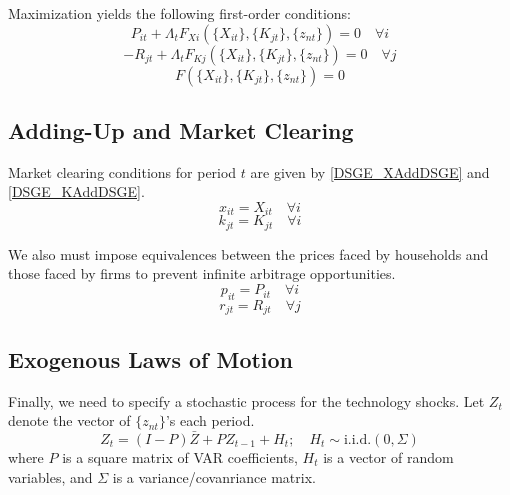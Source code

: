 \documentclass[letterpaper,12pt]{article}
\theoremstyle{definition}
\begin{document}
\begin{spacing}{1.5}
		Maximization yields the following first-order conditions:
		\begin{equation}\label{DSGE_FOC01FirmDSGE}
		P_{it}+\Lambda_t F_{Xi}(\{X_{it}\},\{K_{jt}\},\{z_{nt}\})=0 \quad \forall i
		\end{equation}
		\begin{equation}\label{DSGE_FOC02FirmDSGE}
		-R_{jt}+\Lambda_t F_{Kj}(\{X_{it}\},\{K_{jt}\},\{z_{nt}\})=0 \quad \forall j
		\end{equation}
		\begin{equation}\label{DSGE_FOC03FirmDSGE}
		F(\{X_{it}\},\{K_{jt}\},\{z_{nt}\}) = 0
		\end{equation}

	\subsection{Adding-Up and Market Clearing}
		Market clearing conditions for period $t$ are given by \eqref{DSGE_XAddDSGE} and \eqref{DSGE_KAddDSGE}.
		\begin{equation}\label{DSGE_XAddDSGE}
		x_{it} = X_{it} \quad \forall i
		\end{equation}
		\begin{equation}\label{DSGE_KAddDSGE}
		k_{jt} = K_{jt}  \quad \forall i
		\end{equation}

		We also must impose equivalences between the prices faced by households and those faced by firms to prevent infinite arbitrage opportunities.
		\begin{equation}
		p_{it} = P_{it}  \quad \forall i
		\end{equation}
		\begin{equation}\label{DSGE_RAddDSGE}
		r_{jt} =  R_{jt}  \quad \forall j
		\end{equation}

	\subsection{Exogenous Laws of Motion}\label{DSGE_ExogDSGE}
		Finally, we need to specify a stochastic process for the technology shocks.
		Let $Z_t$ denote the vector of $\{z_{nt}\}$'s each period.
		\begin{equation}\label{DSGE_LoMDSGE}
		Z_t = (I-P)\bar Z +  P Z_{t-1}+ H_t ;\quad H_t\sim\text{i.i.d.}(0,\Sigma)
		\end{equation}
		where $P$ is a square matrix of VAR coefficients, $H_t$ is a vector of random variables, and $\Sigma$ is a variance/covanriance matrix.


\end{spacing}
\end{document}
